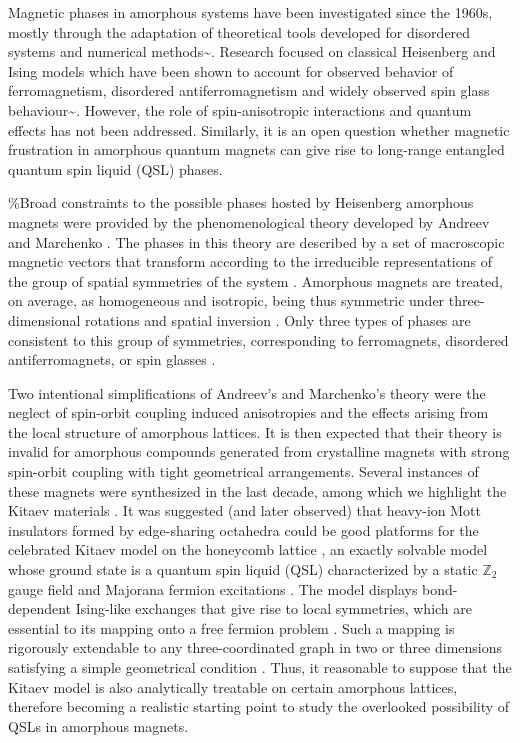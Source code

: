 Magnetic phases in amorphous systems have been investigated since the
1960s, mostly through the adaptation of theoretical tools developed for
disordered systems
\cite{aharony1975critical,Petrakovski1981,kaneyoshi1992introduction,Kaneyoshi2018}
and numerical
methods\textasciitilde{}\cite{fahnle1984monte,plascak2000ising}.
Research focused on classical Heisenberg and Ising models which have
been shown to account for observed behavior of ferromagnetism,
disordered antiferromagnetism and widely observed spin glass
behaviour\textasciitilde{}\cite{coey1978amorphous}. However, the role of
spin-anisotropic interactions and quantum effects has not been
addressed. Similarly, it is an open question whether magnetic
frustration in amorphous quantum magnets can give rise to long-range
entangled quantum spin liquid (QSL) phases.

\%Broad constraints to the possible phases hosted by Heisenberg
amorphous magnets were provided by the phenomenological theory developed
by Andreev and Marchenko \autocite{Andreev1,Andreev2,Andreev3}. The
phases in this theory are described by a set of macroscopic magnetic
vectors that transform according to the irreducible representations of
the group of spatial symmetries of the system \textcite{Andreev1}.
Amorphous magnets are treated, on average, as homogeneous and isotropic,
being thus symmetric under three-dimensional rotations and spatial
inversion \textcite{Andreev2}. Only three types of phases are consistent
to this group of symmetries, corresponding to ferromagnets, disordered
antiferromagnets, or spin glasses \autocite{Andreev2,Andreev3}.

Two intentional simplifications of Andreev's and Marchenko's theory were
the neglect of spin-orbit coupling induced anisotropies and the effects
arising from the local structure of amorphous lattices. It is then
expected that their theory is invalid for amorphous compounds generated
from crystalline magnets with strong spin-orbit coupling with tight
geometrical arrangements. Several instances of these magnets were
synthesized in the last decade, among which we highlight the Kitaev
materials
\autocite{Jackeli2009,HerrmannsAnRev2018,Winter2017,TrebstPhysRep2022,Takagi2019}.
It was suggested (and later observed) that heavy-ion Mott insulators
formed by edge-sharing octahedra could be good platforms for the
celebrated Kitaev model on the honeycomb lattice \textcite{Jackeli2009},
an exactly solvable model whose ground state is a quantum spin liquid
(QSL) \autocite{Anderson1973,Knolle2019,Savary2016,Lacroix2011}
characterized by a static \(\mathbb Z_2\) gauge field and Majorana
fermion excitations \textcite{kitaevAnyonsExactlySolved2006}. The model
displays bond-dependent Ising-like exchanges that give rise to local
symmetries, which are essential to its mapping onto a free fermion
problem \autocite{Baskaran2007,Baskaran2008}. Such a mapping is
rigorously extendable to any three-coordinated graph in two or three
dimensions satisfying a simple geometrical condition
\autocite{Nussinov2009,OBrienPRB2016,yaoExactChiralSpin2007,Peri2020}.
Thus, it reasonable to suppose that the Kitaev model is also
analytically treatable on certain amorphous lattices, therefore becoming
a realistic starting point to study the overlooked possibility of QSLs
in amorphous magnets.

